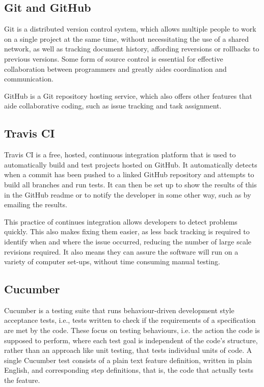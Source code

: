 \documentclass[a4paper, 12pt]{article}
\begin{document}
\subsection{Git and GitHub}

Git is a distributed version control system, which allows multiple people to work on a single project at the same time, without necessitating the use of a shared network, as well as tracking document history, affording reversions or rollbacks to previous versions. Some form of source control is essential for effective collaboration between programmers and greatly aides coordination and communication.

GitHub is a Git repository hosting service, which also offers other features that aide collaborative coding, such as issue tracking and task assignment.

\subsection{Travis CI}

Travis CI is a free, hosted, continuous integration platform that is used to automatically build and test projects hosted on GitHub. It automatically detects when a commit has been pushed to a linked GitHub repository and attempts to build all branches and run tests. It can then be set up to show the results of this in the GitHub readme or to notify the developer in some other way, such as by emailing the results.

This practice of continues integration allows developers to detect problems quickly. This also makes fixing them easier, as less back tracking is required to identify when and where the issue occurred, reducing the number of large scale revisions required. It also means they can assure the software will run on a variety of computer set-ups, without time consuming manual testing.

\subsection{Cucumber}

Cucumber is a testing suite that runs behaviour-driven development style acceptance tests, i.e., tests written to check if the requirements of a specification are met by the code. These focus on testing behaviours, i.e. the action the code is supposed to perform, where each test goal is independent of the code’s structure, rather than an approach like unit testing, that tests individual units of code.
A single Cucumber test consists of a plain text feature definition, written in plain English, and corresponding step definitions, that is, the code that actually tests the feature. 
\end{document}
